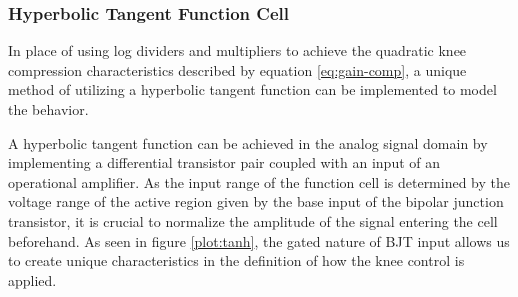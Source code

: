 \documentclass[10pt]{article}
\begin{document}
\begin{multicols*}{2}
                \subsubsection{Hyperbolic Tangent Function Cell}
                    In place of using log dividers and multipliers to achieve the quadratic knee compression characteristics described by equation \ref{eq:gain-comp}, a unique method of utilizing a hyperbolic tangent function can be implemented to model the behavior.\par
                    A hyperbolic tangent function can be achieved in the analog signal domain by implementing a differential transistor pair coupled with an input of an operational amplifier. As the input range of the function cell is determined by the voltage range of the active region given by the base input of the bipolar junction transistor, it is crucial to normalize the amplitude of the signal entering the cell beforehand. As seen in figure \ref{plot:tanh}, the gated nature of BJT input allows us to create unique characteristics in the definition of how the knee control is applied.

                        \noindent
                        \begin{minipage}{\linewidth}

                            \centering
\end{minipage}
\end{multicols*}
\end{document}
